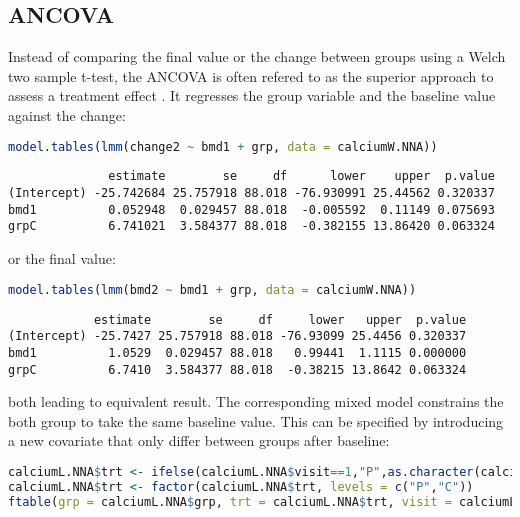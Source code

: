 \documentclass[12pt]{article}
\begin{document}
\clearpage
\subsection{ANCOVA}
\label{sec:orgb9651d7}

Instead of comparing the final value or the change between groups
using a Welch two sample t-test, the ANCOVA is often refered to as the
superior approach to assess a treatment effect
\citep{vickers2001analysing}. It regresses the group variable and the
baseline value against the change:

\begin{lstlisting}[language=r,numbers=none]
model.tables(lmm(change2 ~ bmd1 + grp, data = calciumW.NNA))
\end{lstlisting}

\label{}
\begin{verbatim}
              estimate        se     df      lower    upper  p.value
(Intercept) -25.742684 25.757918 88.018 -76.930991 25.44562 0.320337
bmd1          0.052948  0.029457 88.018  -0.005592  0.11149 0.075693
grpC          6.741021  3.584377 88.018  -0.382155 13.86420 0.063324
\end{verbatim}


or the final value:
\begin{lstlisting}[language=r,numbers=none]
model.tables(lmm(bmd2 ~ bmd1 + grp, data = calciumW.NNA))
\end{lstlisting}

\label{}
\begin{verbatim}
            estimate        se     df     lower   upper  p.value
(Intercept) -25.7427 25.757918 88.018 -76.93099 25.4456 0.320337
bmd1          1.0529  0.029457 88.018   0.99441  1.1115 0.000000
grpC          6.7410  3.584377 88.018  -0.38215 13.8642 0.063324
\end{verbatim}


both leading to equivalent result. The corresponding mixed model
constrains the both group to take the same baseline value. This can be
specified by introducing a new covariate that only differ between
groups after baseline:
\begin{lstlisting}[language=r,numbers=none]
calciumL.NNA$trt <- ifelse(calciumL.NNA$visit==1,"P",as.character(calciumL.NNA$grp))
calciumL.NNA$trt <- factor(calciumL.NNA$trt, levels = c("P","C"))
ftable(grp = calciumL.NNA$grp, trt = calciumL.NNA$trt, visit = calciumL.NNA$visit)
\end{lstlisting}
\end{document}
